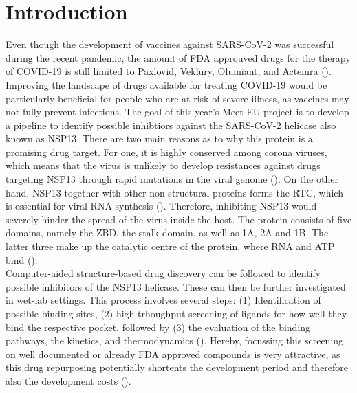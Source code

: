 \documentclass[11pt, letterpaper, titlepage]{article}
\begin{document}
\section{Introduction}
Even though the development of vaccines against SARS-CoV-2 was successful during the recent pandemic, the amount of FDA approuved drugs for the therapy of COVID-19 is still limited to Paxlovid, Veklury, Olumiant, and Actemra (\cite{FDA_COVID}). Improving the landscape of drugs available for treating COVID-19 would be particularly beneficial for people who are at risk of severe illness, as vaccines may not fully prevent infections. The goal of this year's Meet-EU project is to develop a pipeline to identify possible inhibtiors against the SARS-CoV-2 helicase also known as \ac{NSP13}. There are two main reasons as to why this protein is a promising drug target. For one, it is highly conserved among corona viruses, which means that the virus is unlikely to develop resistances against drugs targeting \ac{NSP13} through rapid mutations in the viral genome (\cite{Spratt_2021}). On the other hand, \ac{NSP13} together with other non-structural proteins forms the \ac{RTC}, which is essential for viral RNA synthesis (\cite{Malone_2022}). Therefore, inhibiting \ac{NSP13} would severely hinder the spread of the virus inside the host. 
The protein consists of five domains, namely the \ac{ZBD}, the stalk domain, as well as 1A, 2A and 1B. The latter three make up the catalytic centre of the protein, where RNA and ATP bind (\cite{NSP13_basics}). \\
Computer-aided structure-based drug discovery can be followed to identify possible inhibitors of the \ac{NSP13} helicase. These can then be further investigated in wet-lab settings. This process involves several steps: (1) Identification of possible binding sites, (2) high-trhoughput screening of ligands for how well they bind the respective pocket, followed by (3) the evaluation of the binding pathways, the kinetics, and thermodynamics (\cite{Sledz_2018}). Hereby, focussing this screening on well documented or already FDA approved compounds is very attractive, as this drug repurposing potentially shortents the development period and therefore also the development costs (\cite{Pushpakom_2019}). 
\subsection*{}
\end{document}
